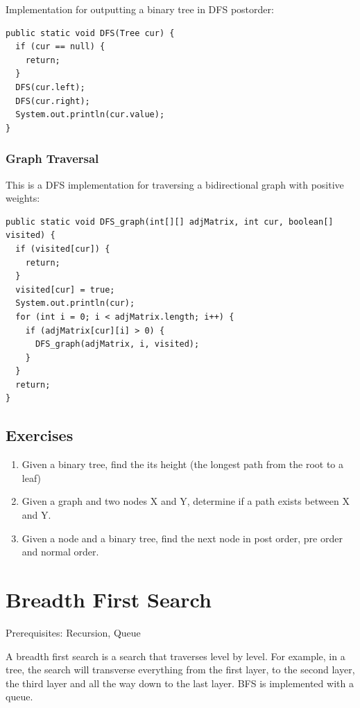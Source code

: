 \documentclass[11pt,oneside]{book}
\begin{document}
Implementation for outputting a binary tree in DFS postorder:

\begin{lstlisting}
public static void DFS(Tree cur) {
  if (cur == null) {
    return;
  }
  DFS(cur.left);
  DFS(cur.right);
  System.out.println(cur.value);
}
\end{lstlisting}

\subsubsection{Graph Traversal}

This is a DFS implementation for traversing a bidirectional graph with positive weights:

\begin{lstlisting}
public static void DFS_graph(int[][] adjMatrix, int cur, boolean[] visited) {
  if (visited[cur]) {
    return;
  }
  visited[cur] = true;
  System.out.println(cur);
  for (int i = 0; i < adjMatrix.length; i++) {
    if (adjMatrix[cur][i] > 0) {
      DFS_graph(adjMatrix, i, visited);
    }
  }
  return;
}
\end{lstlisting}

\subsection{Exercises}

\begin{enumerate}
\item Given a binary tree, find the its height (the longest path from the root to a leaf)
\item Given a graph and two nodes X and Y, determine if a path exists between X and Y.
\item Given a node and a binary tree, find the next node in post order, pre order and normal order.
\end{enumerate}

        \section{ Breadth First Search }
        

Prerequisites: Recursion, Queue

A breadth first search is a search that traverses level by level. For example, in a tree, the search will transverse everything from the first layer, to the second layer, the third layer and all the way down to the last layer. BFS is implemented with a queue.
\end{document}
